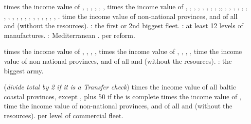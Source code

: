  times the income value of ,
, , ,
, ,
 times the income value of ,
, , ,
, , ,
, ,,
, , ,
, ,
,  ,
, , ,
, , ,
, , ,
, , 
, .
 time the income value of non-national provinces, and of all \COL and
\TP (without the resources).
 \VPs: the first or 2nd biggest fleet.
 \VPs: at least 12 levels of manufactures.
 \VPs: Mediterranean .
 \VPs per reform.

 times the income value of ,
, ,
, 
 times the income value of ,
, , ,
 time the income value of non-national provinces, and of all \COL and
\TP (without the resources).
 \VPs: the biggest army.

\bparag ({\it divide total by 2 if it is a Transfer check})
 times the income value of all baltic coastal provinces, except
, plus 50 \VPs if the 
is complete
 times the income value of ,
 time the income value of non-national provinces, and of all \COL and
\TP (without the resources).
 \VP per level of commercial fleet.




